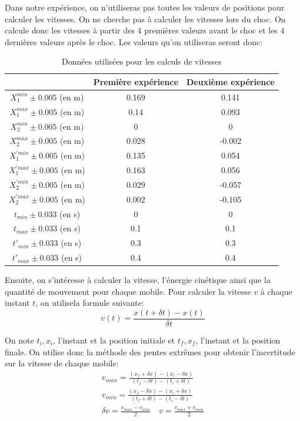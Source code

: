 \documentclass[12pt]{article}
\begin{document}
Dans notre expérience, on n'utiliseras pas toutes les valeurs de positions pour calculer les vitesses. On ne cherche pas à calculer les vitesses lors du choc. On calcule donc les vitesses à partir des 4 premières valeurs avant le choc et les 4 dernières valeurs après le choc. 
\newpage
Les valeurs qu'on utiliseras seront donc:
\begin{table}[!h]
	\begin{center}
		\begin{tabular}{|c|c|c|}
		\hline
	
		& Première expérience & Deuxième expérience \\
		\hline
		$X_1^{min}\pm 0.005$ (en m) & 0.169 & 0.141 \\
		$X_1^{max}\pm 0.005$ (en m) & 0.14 & 0.093 \\
		$X_2^{min}\pm 0.005$ (en m) & 0 & 0 \\
		$X_2^{max}\pm 0.005$ (en m) & 0.028 & -0.002 \\
		$X_1^{'min}\pm 0.005$ (en m) & 0.135 & 0.054 \\
		$X_1^{'max}\pm 0.005$ (en m) & 0.163 & 0.056 \\
		$X_2^{'min}\pm 0.005$ (en m) & 0.029 & -0.057\\
		$X_2^{'max}\pm 0.005$ (en m) & 0.002 & -0.105 \\
		$t_{min}\pm 0.033$ (en s) &0 & 0 \\
		$t_{max}\pm 0.033$ (en s) &0.1 & 0.1 \\
		$t'_{min}\pm 0.033$ (en s) &0.3 & 0.3 \\
		$t'_{max}\pm 0.033$ (en s) & 0.4 & 0.4\\
		\hline
		\end{tabular}
		\caption{Données utilisées pour les calculs de vitesses}
		\label{Tabledonnéesutilisées}
	\end{center}
\end{table}

		
Ensuite, on s'intéresse à calculer la vitesse, l'énergie cinétique ainsi que la quantité de mouvement
pour chaque mobile.
Pour calculer la vitesse $v$ à chaque instant $t$, on utilisela formule suivante:
\begin{equation}
    v(t) = \frac{x(t + \delta t) - x(t)}{\delta t}
\end{equation}

On note $t_i, x_i$, l'instant et la position initiale et $t_f, x_f$, l'instant et la position finale. On utilise donc la méthode
des pentes extrêmes pour obtenir l'incertitude sur la vitesse de chaque mobile:
\begin{gather*}
    v_{max} = \frac{(x_f + \delta x) - (x_i - \delta x)}{(t_f - \delta t) - (t_i + \delta t)} \\
    v_{min} = \frac{(x_f - \delta x) - (x_i + \delta x)}{(t_f + \delta t) - (t_i - \delta t)} \\
    \delta v = \frac{v_{max} - v_{min}}{2} \quad v = \frac{v_{max} + v_{min}}{2}
\end{gather*}
\end{document}
